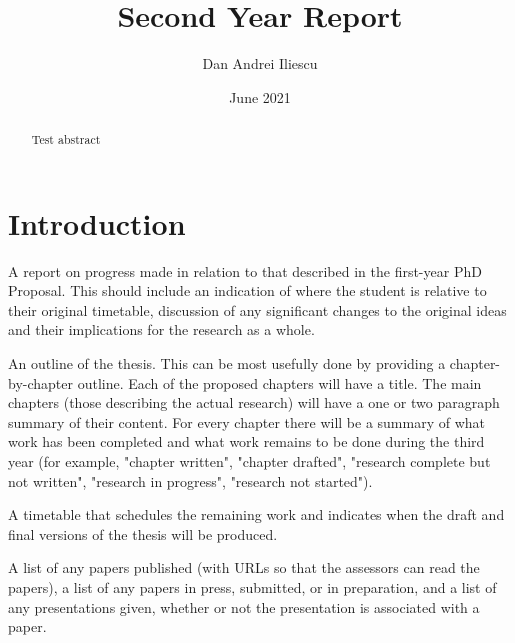 \documentclass{article}
\title{Second Year Report}
\author{Dan Andrei Iliescu}
\date{June 2021}
\begin{document}
\maketitle

\begin{abstract}
    Test abstract
\end{abstract}

\section{Introduction}

A report on progress made in relation to that described in the first-year PhD Proposal. This should include an indication of where the student is relative to their original timetable, discussion of any significant changes to the original ideas and their implications for the research as a whole.

An outline of the thesis. This can be most usefully done by providing a chapter-by-chapter outline. Each of the proposed chapters will have a title. The main chapters (those describing the actual research) will have a one or two paragraph summary of their content. For every chapter there will be a summary of what work has been completed and what work remains to be done during the third year (for example, "chapter written", "chapter drafted", "research complete but not written", "research in progress", "research not started").

A timetable that schedules the remaining work and indicates when the draft and final versions of the thesis will be produced.

A list of any papers published (with URLs so that the assessors can read the papers), a list of any papers in press, submitted, or in preparation, and a list of any presentations given, whether or not the presentation is associated with a paper.
\end{document}
